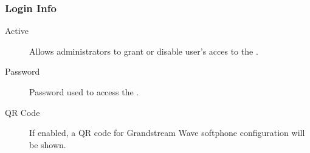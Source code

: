\documentclass[letterpaper,10pt,spanish]{sphinxmanual}
\begin{document}
\subsubsection{Login Info}
\label{administration_portal/client/vpbx/users:login-info}\begin{description}
\item[{Active}] \leavevmode{}\label{administration_portal/client/vpbx/users:term-active}
Allows administrators to grant or disable user's acces to the
{\hyperref[user_portal/index:userportal]{}}.

\item[{Password}] \leavevmode{}\label{administration_portal/client/vpbx/users:term-password}
Password used to access the {\hyperref[user_portal/index:userportal]{}}.

\item[{QR Code}] \leavevmode{}\label{administration_portal/client/vpbx/users:term-qr-code}
If enabled, a QR code for Grandstream Wave softphone configuration
will be shown.

\end{description}
\end{document}
